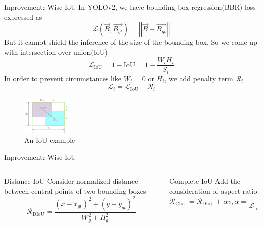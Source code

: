 \begin{frame}{Inprovement: Wise-IoU}
	In YOLOv2, we have bounding box regression(BBR) loss expressed as
	\begin{equation}
		\mathcal{L}(\vec{B},\vec{B_{gt}})=\left|\left|\vec{B}-\vec{B_{gt}}\right|\right|
	\end{equation}
	But it cannot shield the inference of the size of the bounding box. So we come up with intersection over union(IoU)
	\begin{equation}
		\mathcal{L}_\text{IoU}=1-\text{IoU}=1-\frac{W_i H_i}{S_i}
	\end{equation}
	In order to prevent circumstances like $W_i=0$ or $H_i$, we add penalty term $\mathcal{R}_i$
	\begin{equation}
		\mathcal{L}_i=\mathcal{L}_\text{IoU}+\mathcal{R}_i
	\end{equation}
	\begin{figure}[h]
		\centering
		\includegraphics[width=0.21\textwidth]{images/iou.png}
		\caption{An IoU example}
		\label{fig:iou}
	\end{figure}
\end{frame}

\begin{frame}{Inprovement: Wise-IoU}
	\begin{columns}
		\begin{column}{0.5\textwidth}
			\begin{block}{Distance-IoU}
				Consider normalized distance between central points of two bounding boxes
				\begin{equation}
					\mathcal{R}_\text{DIoU}=\frac{\left(x-x_{g t}\right)^2+\left(y-y_{g t}\right)^2}{W_g^2+H_g^2}
				\end{equation}
			\end{block}
		\end{column}
		\pause
		\begin{column}{0.5\textwidth}
			\begin{block}{Complete-IoU}
				Add the consideration of aspect ratio
				\begin{equation}
					\mathcal{R}_\text{CIoU}=\mathcal{R}_\text{DIoU}+\alpha v,\alpha=\frac{v}{\mathcal{L}_\text{IoU}+v}
				\end{equation}
			\end{block}
		\end{column}
	\end{columns}
\end{frame}

